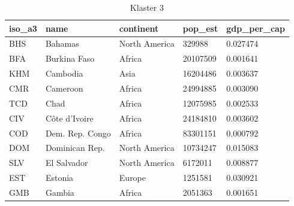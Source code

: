 \documentclass[11pt]{report}
\begin{document}
    \begin{table}[]
        \caption {Klaster 3} \label{tab:cl3}
        \begin{tabular}{lllll}
            \hline
            \multicolumn{1}{|l|}{iso\_a3} & \multicolumn{1}{l|}{name} & \multicolumn{1}{l|}{continent} & \multicolumn{1}{l|}{pop\_est} & \multicolumn{1}{l|}{gdp\_per\_cap} \\ \hline
            BHS                           & Bahamas                   & North America                  & 329988                        & 0.027474                           \\
            BFA                           & Burkina Faso              & Africa                         & 20107509                      & 0.001641                           \\
            KHM                           & Cambodia                  & Asia                           & 16204486                      & 0.003637                           \\
            CMR                           & Cameroon                  & Africa                         & 24994885                      & 0.003090                           \\
            TCD                           & Chad                      & Africa                         & 12075985                      & 0.002533                           \\
            CIV                           & Côte d'Ivoire             & Africa                         & 24184810                      & 0.003602                           \\
            COD                           & Dem. Rep. Congo           & Africa                         & 83301151                      & 0.000792                           \\
            DOM                           & Dominican Rep.            & North America                  & 10734247                      & 0.015083                           \\
            SLV                           & El Salvador               & North America                  & 6172011                       & 0.008877                           \\
            EST                           & Estonia                   & Europe                         & 1251581                       & 0.030921                           \\
            GMB                           & Gambia                    & Africa                         & 2051363                       & 0.001651                           \\

\end{tabular}
\end{table}
\end{document}
